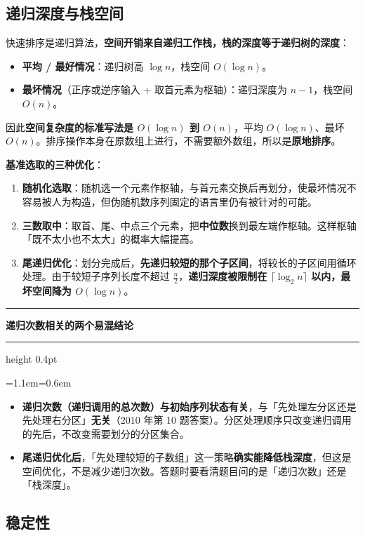 \documentclass[11pt,openany,UTF8]{ctexbook}
\newcommand{\callouthead}[2]{%
  \par\addvspace{7pt}\noindent
  {\color{#1}\rule[-0.15em]{3pt}{1.05em}}\hspace{0.5em}%
  {\bfseries\color{#1}#2}\par\nobreak\vspace{-0.35em}%
  {\color{rulesep}\hrule height 0.4pt}\nobreak\vspace{0.45em}%
  \begingroup\small\setlength{\parindent}{0pt}%
  \leftskip=1.1em\rightskip=0.6em\noindent\ignorespaces}
\newcommand{\calloutend}{\par\endgroup\addvspace{7pt}}
\newenvironment{callwarn}[1]{\callouthead{warnbar}{#1}}{\calloutend}
\begin{document}
\subsection{递归深度与栈空间}

快速排序是递归算法，\textbf{空间开销来自递归工作栈，栈的深度等于递归树的深度}：

\begin{itemize}
\item \textbf{平均 / 最好情况}：递归树高 $\log n$，栈空间 $O(\log n)$。
\item \textbf{最坏情况}（正序或逆序输入 + 取首元素为枢轴）：递归深度为 $n-1$，栈空间 $O(n)$。
\end{itemize}
因此\textbf{空间复杂度的标准写法是 $O(\log n)$ 到 $O(n)$}，平均 $O(\log n)$、最坏 $O(n)$。排序操作本身在原数组上进行，不需要额外数组，所以是\textbf{原地排序}。

\textbf{基准选取的三种优化}：

\begin{enumerate}
\item \textbf{随机化选取}：随机选一个元素作枢轴，与首元素交换后再划分，使最坏情况不容易被人为构造，但伪随机数序列固定的语言里仍有被针对的可能。
\item \textbf{三数取中}：取首、尾、中点三个元素，把\textbf{中位数}换到最左端作枢轴。这样枢轴「既不太小也不太大」的概率大幅提高。
\item \textbf{尾递归优化}：划分完成后，\textbf{先递归较短的那个子区间}，将较长的子区间用循环处理。由于较短子序列长度不超过 $\frac{n}{2}$，\textbf{递归深度被限制在 $\lceil\log_2 n\rceil$ 以内，最坏空间降为 $O(\log n)$}。
\end{enumerate}
\begin{callwarn}{递归次数相关的两个易混结论}
\begin{itemize}
\item \textbf{递归次数（递归调用的总次数）与初始序列状态有关}，与「先处理左分区还是先处理右分区」\textbf{无关}（2010 年第 10 题答案）。分区处理顺序只改变递归调用的先后，不改变需要划分的分区集合。
\item \textbf{尾递归优化后}，「先处理较短的子数组」这一策略\textbf{确实能降低栈深度}，但这是空间优化，不是减少递归次数。答题时要看清题目问的是「递归次数」还是「栈深度」。
\end{itemize}
\end{callwarn}

\subsection{稳定性}
\end{document}
